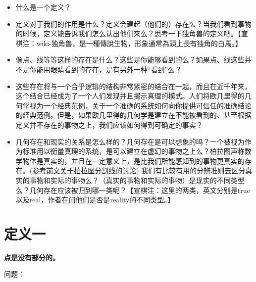 \documentclass[
]{book}
\begin{document}
\begin{itemize}
\item
  什么是一个定义？
\item
  定义对于我们的作用是什么？定义会建起（他们的）存在么？当我们看到事物的时候，定义能告诉我们怎么认出他们来么？思考一下独角兽的定义吧。【宣棋注：wiki-独角兽，是一種傳說生物，形象通常為頭上長有独角的白馬。】
\item
  像点、线等等这样的存在是什么？这些是你能够看到的么？如果点、线这些并不是你能用眼睛看到的存在，是有另外一种``看到''么？
\item
  这些存在将与一个合乎逻辑的结构非常紧密的结合在一起，而且在近千年来，这个结合已经成为了一个人们发现并且揭示真理的模式。人们将欧几里得的几何学视为一个经典范例，关于一个准确的系统如何向你提供可信任的准确结论的经典范例。但是，如果欧几里得的几何学是建立在不能被看到的、甚至根据定义并不存在的事物之上，我们应该如何得到可确定的事实？
\item
  几何存在和现实的关系是怎么样的？几何存在是可以想象的吗？一个被视为作为标准用以衡量真理的系统，是可以建立在虚幻的事物之上么？柏拉图声称数学物体是真实的，并且在一定意义上，是比我们所能感知到的事物更真实的存在。(\protect\hyperlink{plato}{参考前文关于柏拉图分割线的讨论}) 我们有比较有用的分辨准则去区分真实的事物和实际的事物么？（真实的事物和实际的事物）是现实的不同类型么？几何存在应该被归到哪一类呢？【宣棋注：这里的两类，英文分别是true以及real，作者在问他们是否是reality的不同类型。】
\end{itemize}

\hypertarget{ux5b9aux4e49ux4e00}{%
\section{定义一}\label{ux5b9aux4e49ux4e00}}

\textbf{点是没有部分的。}

问题：
\end{document}

